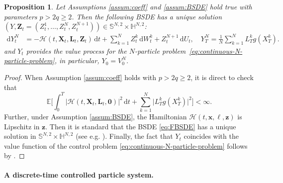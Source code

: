 \documentclass[11pt]{article}
\numberwithin{equation}{section}
\theoremstyle{plain}
\newtheorem{proposition}[theorem]{Proposition}
\theoremstyle{definition}
\theoremstyle{remark}
\newcommand{\bE}{\mathbb{E}}
\newcommand{\dd}{\mathrm{d}}
\newcommand{\x}{\times}
\begin{document}
	\begin{proposition} \label{prop:bsde}
		Let Assumptions \ref{assum:coeff} and \ref{assum:BSDE} hold true with parameters $p > 2 q \ge 2$.
		Then the following BSDE has a unique solution $(Y,  \mathbf{Z}_t = (Z_t^1,\dots,Z_t^N, Z_t^{N+1})) \in \mathbb{S}^{N,2} \x \mathbb{H}^{N,2}$:
		\begin{equation} \label{eq:FBSDE}
			\begin{aligned}
				\dd Y_t^N &=  - \mathcal{H}(t, \mathbf{X}_t, \mathbf{L}_t, \mathbf{Z}_t)\,\dd t + \sum_{k=1}^N Z_t^k \,\dd W_t^k + Z_t^{N+1} \,\dd U_t, 
				\quad Y_T^N = \frac{1}{N}\sum_{k=1}^N L_T^k g(X_T^k).
			\end{aligned}
		\end{equation}
		and $Y_t$ provides the value process for the $N$-particle problem~\eqref{eq:continuous-N-particle-problem}, in particular, $Y_0 = V^N_0$.
	\end{proposition}
	\begin{proof}
		When Assumption \ref{assum:coeff} holds with $p > 2 q \ge 2$, it is direct to check that 
		$$
		\bE \Big[ 
		\int_0^T \big| \mathcal{H}(t, \mathbf{X}_t, \mathbf{L}_t, \mathbf{0} ) \big|^2 \,\dd t 
		+
		\sum_{k=1}^N \big| L_T^k g(X_T^k) \big|^2
		\Big] < \infty.
		$$
		Further, under Assumption \ref{assum:BSDE}, the Hamiltonian $\mathcal{H}(t,\mathbf{x},\bm{\ell},\mathbf{z})$ is Lipschitz in $\mathbf{z}$.
		Then it is standard that the BSDE \eqref{eq:FBSDE} has a unique solution in $\mathbb{S}^{N,2} \x \mathbb{H}^{N,2}$ 
		(see e.g. \cite[Theorem 4.3.1]{zhang2017backward}).
		Finally, the fact that $Y_t$ coincides with the value function of the control problem \eqref{eq:continuous-N-particle-problem} follows by \cite[Theorem 4.5.3]{zhang2017backward}.
	\end{proof}
	
	\paragraph{A discrete-time controlled particle system.}
	
\end{document}
